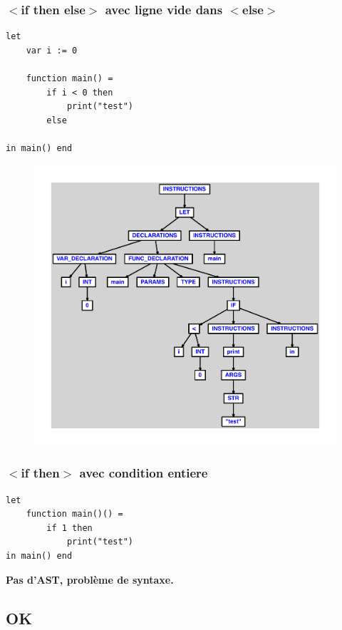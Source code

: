 \documentclass{article}
\begin{document}
\subsubsection{$ < $if then else$ > $ avec ligne vide dans $ < $else$ > $}
\begin{lstlisting}
let
	var i := 0

	function main() =
		if i < 0 then
			print("test")
		else

in main() end
\end{lstlisting}
\newpage
\begin{figure}[H]
\centering
\includegraphics[max width=\textwidth]{ast/ast_256.pdf}
\end{figure}
\newpage
\subsubsection{$ < $if then$ > $ avec condition entiere}
\begin{lstlisting}
let
	function main()() =
		if 1 then
			print("test")
in main() end
\end{lstlisting}
\newpage
{\color{red}\textbf{Pas d'AST, problème de syntaxe.}}
\newpage
\subsection{OK}
\end{document}
